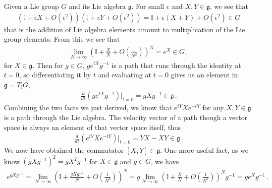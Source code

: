 \documentclass[11pt, onesided]{book}
\theoremstyle{break}
\theoremstyle{break}
\begin{document}
Given a Lie group $G$ and its Lie algebra $\mathfrak{g}$. For small $\epsilon$ and $X,Y \in \mathfrak{g}$, we see that 
\begin{align*}
\left(\mathbb{I} + \epsilon X + O(\epsilon^2)\right)
\left(\mathbb{I} + \epsilon Y + O(\epsilon^2)\right) = \mathbb{I} + \epsilon(X+Y) + O(\epsilon^2) \in G
\end{align*}
that is the addition of Lie algebra elements amount to multiplication of the Lie group elements. From this we see that 
\begin{align*}
\lim_{N\to \infty} \left(\mathbb{I} + \frac{X}{N} + O\left(\frac{1}{N^2}\right)\right)^N  = e^X \in G\,,
\end{align*}
for $X \in \mathfrak{g}$. Then for $g\in G$, $ge^{tX}g^{-1}$ is a path that runs through the identity at $t =0$, so differentiating it by $t$ and evaluating at $t = 0$ gives us an element in $\mathfrak{g} = T_{\mathbb{I}}G$, 
\begin{align*}
\frac{d}{dt}\left( g e^{tX} g^{-1}\right)|_{t=0} = gXg^{-1} \in \mathfrak{g}\,.
\end{align*}
Combining the two facts we just derived, we know that $e^{tY}Xe^{-tY}$ for any $X,Y \in \mathfrak{g}$ is a path through the Lie algebra. The velocity vector of a path though a vector space is always an element of that vector space itself, thus
\begin{align*}
\frac{d}{dt}\left( e^{tY}Xe^{-tY}\right)|_{t=0} = YX-XY \in \mathfrak{g}\,.
\end{align*}
We now have obtained the commutator $[X,Y]\in \mathfrak{g}$. One more useful fact, as we know $(gXg^{-1})^2 = gX^2 g^{-1}$ for $X \in \mathfrak{g}$ and $g \in G$, we have
\begin{align*}
e^{gXg^{-1}} = \lim_{N\to \infty}\left( 
\mathbb{I} + \frac{g Xg^{-1}}{N} + O\left(\frac{1}{N^2}\right)
\right)^N=g\lim_{N\to \infty}\left( 
\mathbb{I} + \frac{X}{N} + O\left(\frac{1}{N^2}\right)
\right)^N g^{-1} = ge^{X}g^{-1}\,.
\end{align*}
\end{document}
